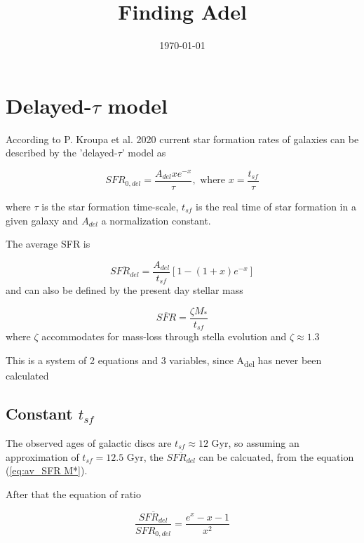 \documentclass[a4paper,twocolumn]{article}
\date{\today}
\title{Finding Adel}
\begin{document}
\maketitle


\section{Delayed-\(\tau\) model}
\label{sec:orgfa1060d}

According to P. Kroupa et al. 2020\autocite{kroupaConstraintsStarFormation2020} current star formation rates of galaxies can be described by the 'delayed-\(\tau\)' model as


\begin{equation} \label{eq:SFR}
SFR_{0,del}=\frac{A_{del}xe^{-x}}{\tau},\text{ where } x=\frac{t_{sf}}{\tau}
\end{equation}

\noindent
where \(\tau\) is the star formation time-scale,  \(t_{sf}\) is the real time of star formation in a given galaxy and \(A_{del}\) a normalization constant.

The average SFR is

\begin{equation}\label{eq:av_SFR-x}
\overline{SFR_{del}}=\frac{A_{del}}{t_{sf}}[1-(1+x)e^{-x}]
\end{equation}
and can also be defined by the present day stellar mass

\begin{equation}\label{eq:av_SFR M*}
    \overline{SFR}=\frac{\zeta M_*}{t_{sf}}
\end{equation}
where \(\zeta\) accommodates for mass-loss through stella evolution and \(\zeta\approx 1.3\)

This is a system of 2 equations and 3 variables, since A\textsubscript{del} has never been calculated


\subsection{Constant \(t_{sf}\)}
\label{sec:org8a4d333}
The observed ages of galactic discs are \(t_{sf}\approx 12\) Gyr\autocite{knoxSurveyCoolWhite1999}, so assuming an approximation of \(t_{sf}=12.5\) Gyr, the \(\overline{SFR_{del}}\) can be calcuated, from the equation (\ref{eq:av_SFR M*}).


After that the equation of ratio


\begin{equation} \label{eq:ratio}
    \frac{\overline{SFR_{del}}}{SFR_{0,del}}=\frac{e^x-x-1}{x^2}
\end{equation}
\end{document}
